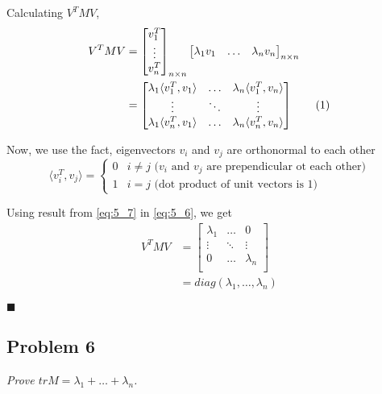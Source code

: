 \documentclass[12pt,a4paper]{article}
\newcommand\numberthis{\addtocounter{equation}{1}\tag{\theequation}}
\newcommand{\rightqed}{
\begin{flushright}
$\blacksquare$
\end{flushright}
}
\begin{document}
Calculating $V^TMV$,
\begin{align*}
    V^TMV &= \begin{bmatrix}
        v_1^T \\ \vdots \\ v_n^T
    \end{bmatrix}_{n \times n}
    \begin{bmatrix}
        \lambda_1v_1 & \hdots & \lambda_nv_n
    \end{bmatrix}_{n \times n} \\
    &= \begin{bmatrix}
        \lambda_1 \langle v_1^T, v_1 \rangle & \hdots & \lambda_n \langle v_1^T, v_n \rangle \\
        \vdots & \ddots & \vdots \\
        \lambda_1 \langle v_n^T, v_1 \rangle & \hdots & \lambda_n \langle v_n^T, v_n \rangle \\
    \end{bmatrix} \numberthis \label{eq:5_6}
\end{align*}

Now, we use the fact, eigenvectors $v_i$ and $v_j$ are orthonormal to each other
\begin{equation}
    \langle v_i^T, v_j \rangle = \begin{cases}
        0 & i \neq j \text{ ($v_i$ and $v_j$ are prependicular ot each other)} \\
        1 & i = j \text{ (dot product of unit vectors is 1)}
    \end{cases} \label{eq:5_7}
\end{equation}

Using result from \eqref{eq:5_7} in \eqref{eq:5_6}, we get
\begin{align*}
    V^TMV &= \begin{bmatrix}
        \lambda_1 & \hdots & 0 \\
        \vdots & \ddots & \vdots \\
        0 & \hdots & \lambda_n \\
    \end{bmatrix} \\
    &= diag (\lambda_1, \hdots, \lambda_n)
\end{align*}
\rightqed

\newpage
\subsection*{Problem 6}
\textit{
    Prove $tr M = \lambda_1 + \hdots + \lambda_n$.
}
\end{document}

